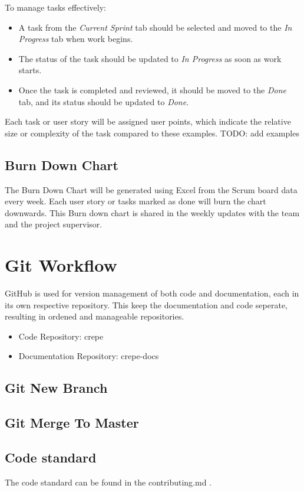 \documentclass{projdoc}
\begin{document}
\noindent
To manage tasks effectively:
\begin{itemize}
	\item A task from the \emph{Current Sprint} tab should be selected and moved to the \emph{In Progress} tab when work begins. 
	\item The status of the task should be updated to \emph{In Progress} as soon as work starts.
	\item Once the task is completed and reviewed, it should be moved to the \emph{Done} tab, and its status should be updated to \emph{Done}.
\end{itemize}

\noindent
Each task or user story will be assigned user points, which indicate the relative size or complexity of the task compared to these examples.
TODO: add examples

\subsection{Burn Down Chart}
The Burn Down Chart will be generated using Excel from the Scrum board data every week.
Each user story or tasks marked as done will burn the chart downwards.
This Burn down chart is shared in the weekly updates with the team and the project supervisor.


\section{Git Workflow}

GitHub is used for version management of both code and documentation, each in its own respective repository.
This keep the documentation and code seperate, resulting in ordened and manageable repositories. 

\begin{itemize}
	\item Code Repository: crepe \autocite{crepe:code-repo}
	\item Documentation Repository: crepe-docs \autocite{crepe:docs-repo}
\end{itemize}

\subsection{Git New Branch}
\subsection{Git Merge To Master}
\subsection{Code standard}
The code standard can be found in the contributing.md \autocite{crepe:code-standard}.
\end{document}

